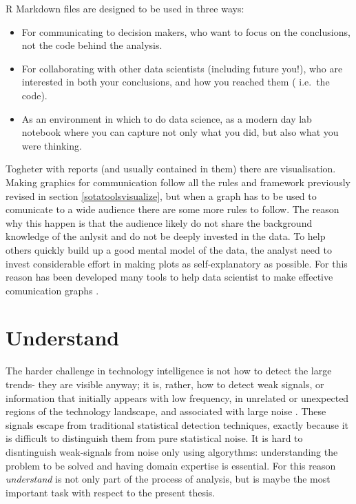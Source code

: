 \documentclass[]{book}
\begin{document}
R Markdown files are designed to be used in three ways:

\begin{itemize}
\item
  For communicating to decision makers, who want to focus on the
  conclusions, not the code behind the analysis.
\item
  For collaborating with other data scientists (including future you!),
  who are interested in both your conclusions, and how you reached them
  ( i.e.~the code).
\item
  As an environment in which to do data science, as a modern day lab
  notebook where you can capture not only what you did, but also what
  you were thinking.
\end{itemize}

Togheter with reports (and usually contained in them) there are
visualisation. Making graphics for communication follow all the rules
and framework previously revised in section \ref{sotatoolsvisualize},
but when a graph has to be used to comunicate to a wide audience there
are some more rules to follow. The reason why this happen is that the
audience likely do not share the background knowledge of the anlysit and
do not be deeply invested in the data. To help others quickly build up a
good mental model of the data, the analyst need to invest considerable
effort in making plots as self-explanatory as possible. For this reason
has been developed many tools to help data scientist to make effective
comunication
graphs\citep{wickham2016ggplot2, shiny2017, plotly2017, ggprah2018, ICWSM09154}
.

\section{Understand}\label{sotadocumentsunderstand}

The harder challenge in technology intelligence is not how to detect the
large trends- they are visible anyway; it is, rather, how to detect weak
signals, or information that initially appears with low frequency, in
unrelated or unexpected regions of the technology landscape, and
associated with large noise \citep{apreda2016functional}. These signals
escape from traditional statistical detection techniques, exactly
because it is difficult to distinguish them from pure statistical noise.
It is hard to disntinguish weak-signals from noise only using
algorythms: understanding the problem to be solved and having domain
expertise is essential. For this reason \emph{understand} is not only
part of the process of analysis, but is maybe the most important task
with respect to the present thesis.
\end{document}
